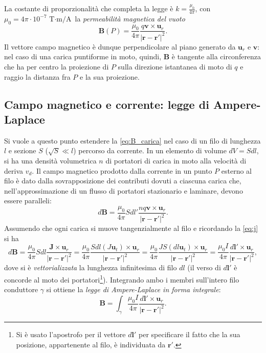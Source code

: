 \documentclass[a4paper,11pt]{report}
\begin{document}
\noindent
La costante di proporzionalità che completa la legge è $k = \frac{\mu_0}{4\pi}$, con $\mu_0 = 4\pi \cdot 10^{-7} \, \si{\tesla\cdot\meter\per\ampere}$ la \textit{permeabilità magnetica del vuoto}
\begin{equation}
\bm{B}(P) =  \frac{\mu_0}{4\pi} \frac{q\bm{v} \times \bm{u}_r}{|\bm{r}-\bm{r}'|^2}.
\label{eq:B_carica}
\end{equation}
Il vettore campo magnetico è dunque perpendicolare al piano generato da $\bm{u}_r$ e $\bm{v}$: nel caso di una carica puntiforme in moto, quindi, $\bm{B}$ è tangente alla circonferenza che ha per centro la proiezione di $P$ sulla direzione istantanea di moto di $q$ e raggio la distanza fra $P$ e la sua proiezione.


\subsection{Campo magnetico e corrente: legge di Ampere-Laplace}
Si vuole a questo punto estendere la \eqref{eq:B_carica} nel caso di un filo di lunghezza $l$ e sezione $S$ ($\sqrt{S} \ll l$) percorso da corrente. In un elemento di volume $dV = Sdl$, si ha una densità volumetrica $n$ di portatori di carica in moto alla velocità di deriva $v_d$. Il campo magnetico prodotto dalla corrente in un punto $P$ esterno al filo è dato dalla sovrapposizione dei contributi dovuti a ciascuna carica che, nell'approssimazione di un flusso di portatori stazionario e laminare, devono essere paralleli:
\begin{equation}
d\bm{B} = \frac{\mu_0}{4\pi} Sdl'  \frac{nq\bm{v} \times \bm{u}_r}{|\bm{r}-\bm{r}'|^2}.
\end{equation}
Assumendo che ogni carica si muove tangenzialmente al filo e ricordando la \eqref{eq:j} si ha
\begin{equation}
d\bm{B} = \frac{\mu_0}{4\pi} Sdl  \frac{\bm{J} \times \bm{u}_r}{|\bm{r}-\bm{r}'|^2} = \frac{\mu_0}{4\pi} \frac{Sdl(J\bm{u}_t) \times \bm{u}_r}{|\bm{r}-\bm{r}'|^2} = \frac{\mu_0}{4\pi} \frac{JS(dl\bm{u}_t) \times \bm{u}_r}{|\bm{r}-\bm{r}'|^2} = \frac{\mu_0I}{4\pi} \frac{d\bm{l}' \times \bm{u}_r}{|\bm{r}-\bm{r}'|^2},
\end{equation}
dove si è \textit{vettorializzata} la lunghezza infinitesima di filo $dl$ (il verso di $d\bm{l}'$ è concorde al moto dei portatori\footnote{Si è usato l'apostrofo per il vettore $d\bm{l}'$ per specificare il fatto che la sua posizione, appartenente al filo, è individuata da $\bm{r}'$.}). Integrando ambo i membri sull'intero filo conduttore $\gamma$ si ottiene la \textit{legge di Ampere-Laplace in forma integrale}:
\begin{equation}
\bm{B} = \int_\gamma \frac{\mu_0I}{4\pi} \frac{d\bm{l}' \times \bm{u}_r}{|\bm{r}-\bm{r}'|^2}.
\end{equation}
\end{document}
